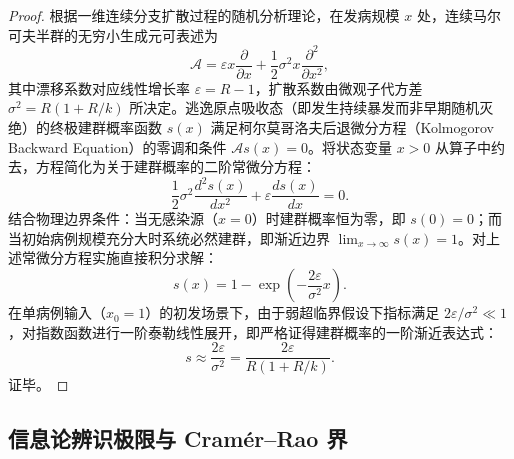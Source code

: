 \documentclass[11pt,a4paper]{article}
\theoremstyle{plain}
\theoremstyle{definition}
\begin{document}
\begin{proof}
根据一维连续分支扩散过程的随机分析理论\citep{ethier1986markov, whittle1955outcome}，在发病规模 $x$ 处，连续马尔可夫半群的无穷小生成元可表述为
\begin{equation}
\mathcal{A} = \varepsilon x \frac{\partial}{\partial x} + \frac{1}{2} \sigma^2 x \frac{\partial^2}{\partial x^2},
\end{equation}
其中漂移系数对应线性增长率 $\varepsilon = R - 1$，扩散系数由微观子代方差 $\sigma^2 = R(1 + R/k)$ 所决定。逃逸原点吸收态（即发生持续暴发而非早期随机灭绝）的终极建群概率函数 $s(x)$ 满足柯尔莫哥洛夫后退微分方程（Kolmogorov Backward Equation）的零调和条件 $\mathcal{A} s(x) = 0$。将状态变量 $x > 0$ 从算子中约去，方程简化为关于建群概率的二阶常微分方程：
\begin{equation}
\frac{1}{2} \sigma^2 \frac{d^2 s(x)}{dx^2} + \varepsilon \frac{ds(x)}{dx} = 0.
\end{equation}
结合物理边界条件：当无感染源（$x=0$）时建群概率恒为零，即 $s(0) = 0$；而当初始病例规模充分大时系统必然建群，即渐近边界 $\lim_{x\to\infty} s(x) = 1$。对上述常微分方程实施直接积分求解：
\begin{equation}
s(x) = 1 - \exp\left(-\frac{2\varepsilon}{\sigma^2} x\right).
\end{equation}
在单病例输入（$x_0 = 1$）的初发场景下，由于弱超临界假设下指标满足 $2\varepsilon/\sigma^2 \ll 1$，对指数函数进行一阶泰勒线性展开，即严格证得建群概率的一阶渐近表达式：
\begin{equation}
s \approx \frac{2\varepsilon}{\sigma^2} = \frac{2\varepsilon}{R(1 + R/k)}.
\end{equation}
证毕。
\end{proof}

\subsection{信息论辨识极限与 Cram\'er--Rao 界}
\end{document}
